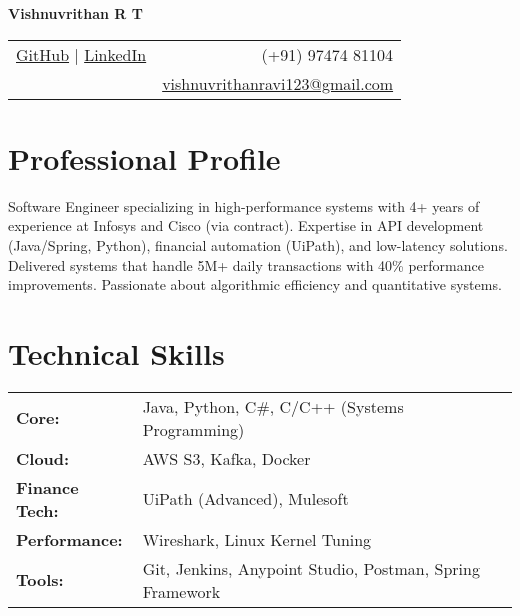 \documentclass[letterpaper,11pt]{article}
\begin{document}
\noindent\textbf{\LARGE Vishnuvrithan R T}\vspace{4pt}\\

\noindent\begin{tabular*}{\textwidth}{@{\extracolsep{\fill}} l r @{}}
    \href{https://github.com/vishnuvrithan}{GitHub} \quad | \quad \href{https://linkedin.com/in/vishnuvrithan-r-352a37193/}{LinkedIn} & (+91) 97474 81104 \\
    & \href{mailto:vishnuvrithanravi123@gmail.com}{vishnuvrithanravi123@gmail.com} \\
\end{tabular*}

\section*{Professional Profile}
Software Engineer specializing in high-performance systems with 4+ years of experience at Infosys and Cisco (via contract). Expertise in API development (Java/Spring, Python), financial automation (UiPath), and low-latency solutions. Delivered systems that handle 5M+ daily transactions with 40\% performance improvements. Passionate about algorithmic efficiency and quantitative systems.

\section*{Technical Skills}
\begin{tabular}{ll}
    \textbf{Core:} & Java, Python, C\#, C/C++ (Systems Programming) \\
    \textbf{Cloud:} & AWS S3, Kafka, Docker \\
    \textbf{Finance Tech:} & UiPath (Advanced), Mulesoft \\
    \textbf{Performance:} & Wireshark, Linux Kernel Tuning \\
    \textbf{Tools:} & Git, Jenkins, Anypoint Studio, Postman, Spring Framework \\
\end{tabular}
\end{document}
